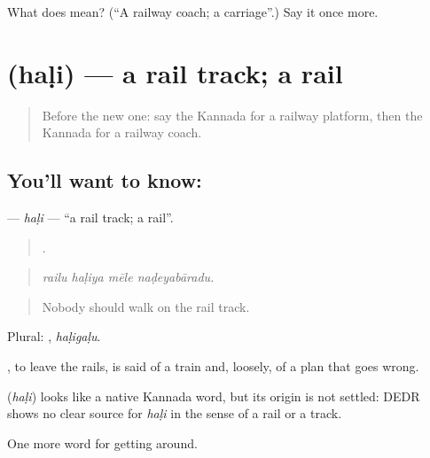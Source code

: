 \begin{tcolorbox}[breakable,colback=teal!4,colframe=teal!35!black,title={Before you move on}]
What does  mean? (\textquotedblleft{}A railway coach; a carriage\textquotedblright{}.) Say it once more.
\end{tcolorbox}
\section[\texorpdfstring{\kn{ಹಳಿ} (haḷi)}{ಹಳಿ (haḷi)}]{ (haḷi) — a rail track; a rail}

\label{lesson:KA-C433-hali}



\begin{quote}
Before the new one: say the Kannada for a railway platform, then the Kannada for a railway coach.
\end{quote}

\subsection*{You'll want to know: }
\textbf{} — \emph{haḷi} — \textquotedblleft{}a rail track; a rail\textquotedblright{}.

\begin{quote}
   .
\end{quote}

\begin{quote}
\emph{railu haḷiya mēle naḍeyabāradu.}
\end{quote}

\begin{quote}
Nobody should walk on the rail track.
\end{quote}

Plural: , \emph{haḷigaḷu}.

 , to leave the rails, is said of a train and, loosely, of a plan that goes wrong.

\begin{cousinweb}
\textbf{} (\emph{haḷi}) looks like a native Kannada word, but its origin is not settled: DEDR shows no clear source for \emph{haḷi} in the sense of a rail or a track.
\end{cousinweb}

\begin{grammarlens}[title={What you've built}]
One more word for getting around.
\end{grammarlens}

